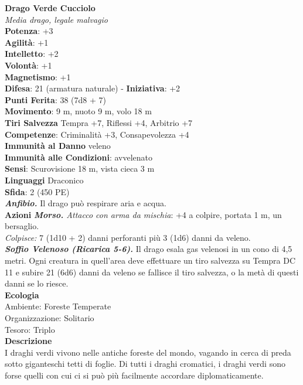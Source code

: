 \begin{multicols}{2}
\medskip\textbf{Drago Verde Cucciolo}\\
\emph{Media drago, legale malvagio}\\
\textbf{Potenza}: +3\\
\textbf{Agilità}: +1\\
\textbf{Intelletto}: +2\\
\textbf{Volontà}: +1\\
\textbf{Magnetismo}: +1\\
\textbf{Difesa}: 21 (armatura naturale) - \textbf{Iniziativa}: +2\\
\textbf{Punti Ferita}: 38 (7d8 + 7)\\
\textbf{Movimento}: 9 m, nuoto 9 m, volo 18 m\\
\textbf{Tiri Salvezza} Tempra +7, Riflessi +4, Arbitrio +7\\
\textbf{Competenze}: Criminalità +3, Consapevolezza +4\\
\textbf{Immunità al Danno} veleno \\
\textbf{Immunità alle Condizioni}: avvelenato\\
\textbf{Sensi}: Scurovisione 18 m, vista cieca 3 m \\
\textbf{Linguaggi} Draconico\\
\textbf{Sfida}: 2 (450 PE)\smallskip\\
\emph{\textbf{Anfibio.}} Il drago può respirare aria e acqua.\\
\smallskip\textbf{Azioni}
\emph{\textbf{Morso.} Attacco con arma da mischia}: +4 a colpire, portata 1 m, un bersaglio.\\
\emph{Colpisce:} 7 (1d10 + 2) danni perforanti più 3 (1d6) danni da veleno.\\
\emph{\textbf{Soffio Velenoso (Ricarica 5-6).}} Il drago esala gas velenosi in un cono di 4,5 metri. Ogni creatura in quell'area deve effettuare un tiro salvezza su Tempra DC 11 e subire 21 (6d6) danni da veleno se fallisce il tiro salvezza, o la metà di questi danni se lo riesce.\\
\textbf{Ecologia}\\
Ambiente: Foreste Temperate\\
Organizzazione: Solitario\\
Tesoro: Triplo\\
\textbf{Descrizione}\\
I draghi verdi vivono nelle antiche foreste del mondo, vagando in cerca di preda sotto giganteschi tetti di foglie. Di tutti i draghi cromatici, i draghi verdi sono forse quelli con cui ci si può più facilmente accordare diplomaticamente.\\


\end{multicols}
